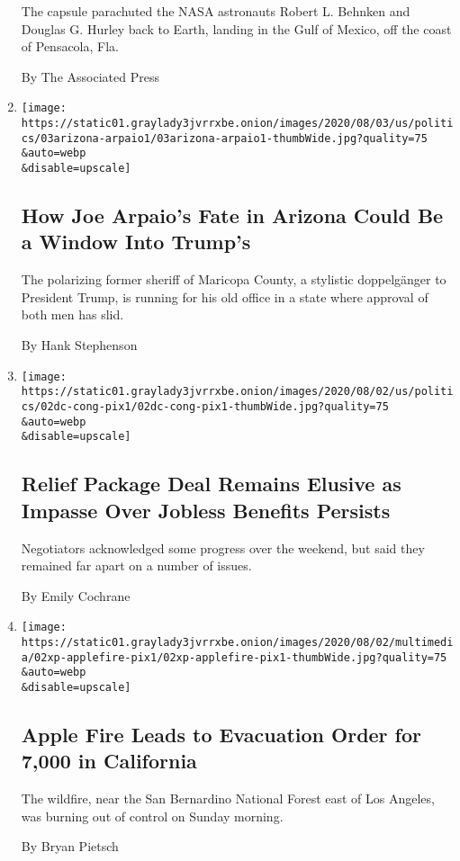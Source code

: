 \begin{enumerate}
  The capsule parachuted the NASA astronauts Robert L. Behnken and
  Douglas G. Hurley back to Earth, landing in the Gulf of Mexico, off
  the coast of Pensacola, Fla.

  By The Associated Press
\item
  \href{/2020/08/02/us/politics/arizona-election-joe-arpaio.html}{}

  \texttt{[image: https://static01.graylady3jvrrxbe.onion/images/2020/08/03/us/politics/03arizona-arpaio1/03arizona-arpaio1-thumbWide.jpg?quality=75\\\&auto=webp\\\&disable=upscale]}

  \hypertarget{how-joe-arpaios-fate-in-arizona-could-be-a-window-into-trumps}{%
  \subsection{How Joe Arpaio's Fate in Arizona Could Be a Window Into
  Trump's}\label{how-joe-arpaios-fate-in-arizona-could-be-a-window-into-trumps}}

  The polarizing former sheriff of Maricopa County, a stylistic
  doppelgänger to President Trump, is running for his old office in a
  state where approval of both men has slid.

  By Hank Stephenson
\item
  \href{/2020/08/02/us/politics/coronavirus-jobless-aid.html}{}

  \texttt{[image: https://static01.graylady3jvrrxbe.onion/images/2020/08/02/us/politics/02dc-cong-pix1/02dc-cong-pix1-thumbWide.jpg?quality=75\\\&auto=webp\\\&disable=upscale]}

  \hypertarget{relief-package-deal-remains-elusive-as-impasse-over-jobless-benefits-persists}{%
  \subsection{Relief Package Deal Remains Elusive as Impasse Over
  Jobless Benefits
  Persists}\label{relief-package-deal-remains-elusive-as-impasse-over-jobless-benefits-persists}}

  Negotiators acknowledged some progress over the weekend, but said they
  remained far apart on a number of issues.

  By Emily Cochrane
\item
  \href{/2020/08/02/us/apple-fire-ca.html}{}

  \texttt{[image: https://static01.graylady3jvrrxbe.onion/images/2020/08/02/multimedia/02xp-applefire-pix1/02xp-applefire-pix1-thumbWide.jpg?quality=75\\\&auto=webp\\\&disable=upscale]}

  \hypertarget{apple-fire-leads-to-evacuation-order-for-7000-in-california}{%
  \subsection{Apple Fire Leads to Evacuation Order for 7,000 in
  California}\label{apple-fire-leads-to-evacuation-order-for-7000-in-california}}

  The wildfire, near the San Bernardino National Forest east of Los
  Angeles, was burning out of control on Sunday morning.

  By Bryan Pietsch
\end{enumerate}

